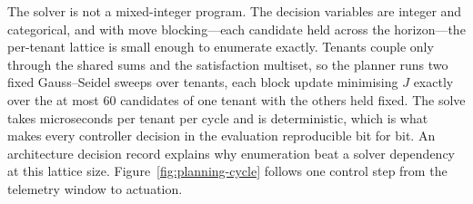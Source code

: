 The solver is not a mixed-integer program. The decision variables are
integer and categorical, and with move blocking---each candidate held
across the horizon---the per-tenant lattice is small enough to enumerate
exactly. Tenants couple only through the shared sums and the satisfaction
multiset, so the planner runs two fixed Gauss--Seidel sweeps over tenants,
each block update minimising $J$ exactly over the at most 60 candidates of
one tenant with the others held fixed. The solve takes microseconds per
tenant per cycle and is deterministic, which is what makes every controller
decision in the evaluation reproducible bit for bit. An architecture
decision record explains why enumeration beat a solver dependency at this
lattice size. Figure~\ref{fig:planning-cycle} follows one control step
from the telemetry window to actuation.

